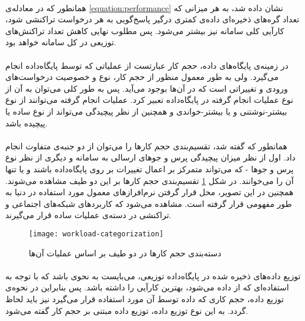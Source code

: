 \paragraph*{}
همانطور که در معادله‌ی
\ref{equation:performance}
نشان داده شد، به هر میزانی که تعداد گره‌های ذخیره‌ای داده‌ی کمتری درگیر پاسخ‌گویی به هر درخواست تراکنشی شود، کارآیی کلی سامانه نیز بیشتر می‌شود. پس مطلوب نهایی کاهش تعداد تراکنش‌های توزیعی در کل سامانه خواهد بود.

\paragraph*{}
در زمینه‌ی پایگاه‌های داده، حجم کار عبارتست از عملیاتی که توسط پایگاه‌داده انجام می‌گیرد. ولی به طور معمول منظور از حجم کار، نوع و خصوصیت درخواست‌های ورودی و تغییراتی است که در آن‌ها بوجود می‌آید. پس به طور کلی می‌توان به آن از نوع عملیات انجام گرفته در پایگاه‌داده تعبیر کرد. عملیات انجام گرفته می‌توانند از نوع بیشتر-نوشتنی و یا بیشتر-خواندی و همچنین از نظر پیچیدگی می‌تواند از نوع ساده یا پیچیده باشد.
\cite{cattell-2011}

\paragraph*{}
همانطور که گفته شد، تقسیم‌بندی حجم کارها را می‌توان از دو جنبه‌ی متفاوت انجام داد. اول از نظر میزان پیچیدگی پرس و جو‌های ارسالی به سامانه و دیگری از نظر نوع پرس و جوها - که می‌تواند متمرکز بر اعمال تغییرات بر روی پایگاه‌داده باشند و یا تنها آن را می‌خوانند. در شکل
\ref{image:workload-categorization}
تقسیم‌بندی حجم کارها بر این دو طیف مشاهده می‌شوند. همچنین در این تصویر، محل قرار گرفتن نرم‌افرازهای معمول مورد استفاده در دنیا به طور مفهومی قرار گرفته است. مشاهده می‌شود که کاربردهای شبکه‌های اجتماعی و تراکنشی در دسته‌ی عملیات ساده
قرار می‌گیرند.
\cite{cattell-2011}


\begin{figure}[h]
	\texttt{[image: workload-categorization]}
	\caption{دسته‌بندی حجم کارها در دو طیف بر اساس عملیات آن‌ها}
	\label{image:workload-categorization}
\end{figure}

\paragraph*{}
توزیع داده‌های ذخیره شده در پایگاه‌داده توزیعی، می‌بایست به نحوی باشد که با توجه به استفاده‌ای که از داده می‌شود، بهترین کارآیی را داشته باشد. پس بنابراین در نحوه‌ی توزیع داده، حجم کاری که داده توسط آن مورد استفاده قرار می‌گیرد نیز باید لحاظ گردد.
\cite{kamal-2016}
به این نوع توزیع داده، توزیع داده مبتنی بر حجم کار
گفته می‌شود.

